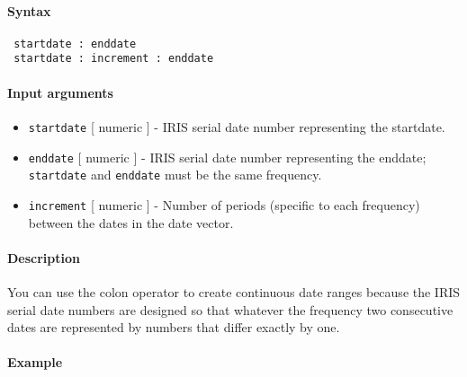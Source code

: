 


	\paragraph{Syntax}
 
 \begin{verbatim}
 startdate : enddate
 startdate : increment : enddate
 \end{verbatim}
 
 \paragraph{Input arguments}
 
 \begin{itemize}
 \item
   \texttt{startdate} {[} numeric {]} - IRIS serial date number
   representing the startdate.
 \item
   \texttt{enddate} {[} numeric {]} - IRIS serial date number
   representing the enddate; \texttt{startdate} and \texttt{enddate} must
   be the same frequency.
 \item
   \texttt{increment} {[} numeric {]} - Number of periods (specific to
   each frequency) between the dates in the date vector.
 \end{itemize}
 
 \paragraph{Description}
 
 You can use the colon operator to create continuous date ranges because
 the IRIS serial date numbers are designed so that whatever the frequency
 two consecutive dates are represented by numbers that differ exactly by
 one.
 
 \paragraph{Example}


